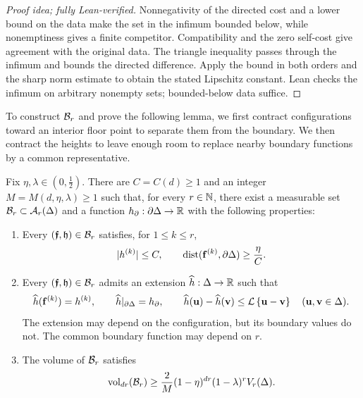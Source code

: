 \documentclass[11pt,letterpaper]{article}
\begin{document}
\begin{proof}[Proof idea; fully Lean-verified]
Nonnegativity of the directed cost and a lower bound on the data make the set in the infimum bounded below, while nonemptiness gives a finite competitor. Compatibility and the zero self-cost give agreement with the original data. The triangle inequality passes through the infimum and bounds the directed difference. Apply the bound in both orders and the sharp norm estimate to obtain the stated Lipschitz constant. Lean checks the infimum on arbitrary nonempty sets; bounded-below data suffice.
\end{proof}

To construct $\mathcal B_r$ and prove the following lemma, we first contract configurations toward an interior floor point to separate them from the boundary. We then contract the heights to leave enough room to replace nearby boundary functions by a common representative.


\begin{lemma}\label{lem:matching}
      Fix $\eta,\lambda\in (0,\frac12)$. There are $C=C(d)\ge 1$ and an integer $M=M(d,\eta,\lambda)\ge1$ such that, for every $r\in\mathbb N$, there exist a measurable set $\mathcal B_r\subset\mathcal A_r(\Delta)$ and a function $h_\partial:\partial\Delta\to\mathbb R$ with the following properties:
      \begin{enumerate}[label=\textup{(\roman*)},ref=\textup{(\roman*)},leftmargin=*]
            \item \label{item:fit-bounds}
                  Every $(\bm{\mathfrak f},\mathfrak h)\in\mathcal B_r$ satisfies, for $1\le k\le r$,
                  \[
                        |h^{(k)}|\le C, \qquad \operatorname{dist}(\mathbf f^{(k)},\partial\Delta)\ge\frac{\eta}{C}.
                  \]
            \item \label{item:fit-extension}
                  Every $(\bm{\mathfrak f},\mathfrak h)\in\mathcal B_r$ admits an extension $\widehat h:\Delta\to\mathbb R$ such that
                  \[
                        \widehat h(\mathbf f^{(k)})=h^{(k)},\qquad \widehat h|_{\partial\Delta}=h_\partial,\qquad \widehat h(\mathbf u)-\widehat h(\mathbf v)\le\mathcal L\left\{\mathbf u-\mathbf v\right\} \quad(\mathbf u,\mathbf v\in\Delta).
                  \]
                  The extension may depend on the configuration, but its boundary values do not. The common boundary function may depend on $r$.
            \item \label{item:fit-volume}
                  The volume of $\mathcal B_r$ satisfies
                  \begin{equation}\label{eq:matching}
                        \operatorname{vol}_{dr}(\mathcal B_r)\ge\frac{2}M(1-\eta)^{dr}(1-\lambda)^r V_r(\Delta).
                  \end{equation}
      \end{enumerate}
\end{lemma}
\end{document}
